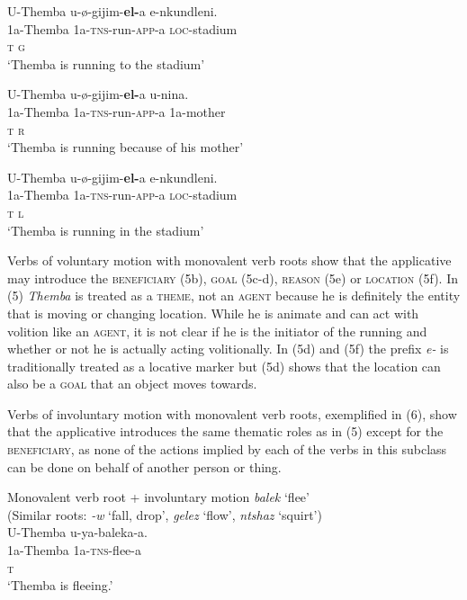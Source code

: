 \documentclass[output=paper]{langsci/langscibook}
\begin{document}
\ex
\gll U-Themba u-ø-gijim-\textbf{el-}a e-nkundleni. \\
 1a-Themba 1a-\textsc{tns}-run-\textsc{app}-a \textsc{loc}-stadium\\
 \textsc{t g}\\
\glt ‘Themba is running to the stadium’

\ex
\gll U-Themba u-ø-gijim-\textbf{el-}a u-nina. \\
 1a-Themba 1a-\textsc{tns}-run-\textsc{app}-a 1a-mother\\
 \textsc{t r}\\
\glt ‘Themba is running because of his mother’

\ex
\gll U-Themba u-ø-gijim-\textbf{el-}a e-nkundleni. \\
 1a-Themba 1a-\textsc{tns}-run-\textsc{app}-a \textsc{loc}-stadium\\
 \textsc{t l}\\
\glt ‘Themba is running in the stadium’
\z
\z

Verbs of voluntary motion with monovalent verb roots show that the applicative may introduce the \textsc{beneficiary }(5b), \textsc{goal }(5c-d), \textsc{reason }(5e) or \textsc{location }(5f). In (5) \textit{Themba} is treated as a \textsc{theme}, not an \textsc{agent} because he is definitely the entity that is moving or changing location. While he is animate and can act with volition like an \textsc{agent,} it is not clear if he is the initiator of the running and whether or not he is actually acting volitionally. In (5d) and (5f) the prefix \textit{e-} is traditionally treated as a locative marker but (5d) shows that the location can also be a \textsc{goal} that an object moves towards.

 Verbs of involuntary motion with monovalent verb roots, exemplified in (6), show that the applicative introduces the same thematic roles as in (5) except for the \textsc{beneficiary,} as none of the actions implied by each of the verbs in this subclass can be done on behalf of another person or thing.

\ea
{Monovalent verb root + involuntary motion \textit{balek }‘flee’}\\
 (Similar roots: \textit{-w} ‘fall, drop’, \textit{gelez} ‘flow’, \textit{ntshaz} ‘squirt’)\\
\ea
\gll U-Themba u-ya-baleka-a. \\
 1a-Themba 1a-\textsc{tns}-flee-a \\
 \textsc{t}\\
\glt ‘Themba is fleeing.’
\end{document}
